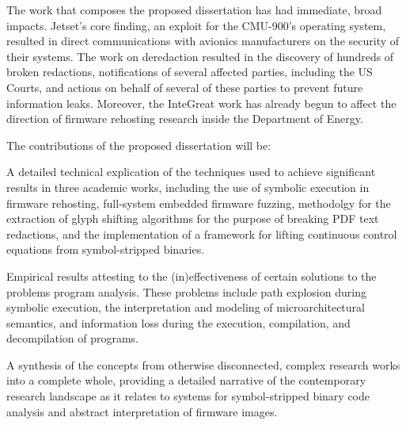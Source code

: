 The work that composes the proposed dissertation has had immediate, broad impacts.
Jetset's core finding, an exploit for the CMU-900's operating system, resulted in direct communications with avionics manufacturers on the security of their systems.
The work on deredaction resulted in the discovery of hundreds of broken redactions, notifications of several affected parties, including the US Courts, and actions on behalf of several of these parties to prevent future information leaks. 
Moreover, the InteGreat work has already begun to affect the direction of firmware rehosting research inside the Department of Energy.

The contributions of the proposed dissertation will be:

\begin{prettylist}
\item A detailed technical explication of the techniques used to achieve significant results in three academic works, including the use of symbolic execution in firmware rehosting, full-system embedded firmware fuzzing, methodolgy for the extraction of glyph shifting algorithms for the purpose of breaking PDF text redactions, and the implementation of a framework for lifting continuous control equations from symbol-stripped binaries.
\item Empirical results attesting to the (in)effectiveness of certain solutions to the problems program analysis. These problems include path explosion during symbolic execution, the interpretation and modeling of microarchitectural semantics, and information loss during the execution, compilation, and decompilation of programs.
\item A synthesis of the concepts from otherwise disconnected, complex research works into a complete whole, providing a detailed narrative of the contemporary research landscape as it relates to systems for symbol-stripped binary code analysis and abstract interpretation of firmware images.
\end{prettylist}
